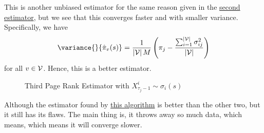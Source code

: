 This is another unbiased estimator for the same reason given in the \hyperref[subsec:second-page-rank-estimator]{second estimator},
but we see that this converges faster and with smaller variance. Specifically, we have
\[
	\variance{}{\hat{\pi}_v(s)} = \frac{1}{\left\vert \mathcal{\MakeUppercase{v}}  \right\vert M}\left(\pi_{j} - \frac{\sum_{i=1}^{\left\vert \mathcal{\MakeUppercase{v}}  \right\vert} \sigma_{ij}^2}{\left\vert \mathcal{\MakeUppercase{v}}  \right\vert}\right)
\]
for all \(v\in \mathcal{\MakeUppercase{v}} \). Hence, this is a better estimator.

\begin{figure}[H]
	\centering
	\caption{Third Page Rank Estimator with \(X^i_{\tau_j - 1}\sim\sigma_i(s)\)}
	\label{fig:Monte-Carlo-Estimator-3}
\end{figure}

\begin{problem}
Although the estimator found by \hyperref[algo:Monte-Carlo-algorithm-3]{this algorithm} is better than the other two,
but it still has its flaws.  The main thing is, it throws away so much data, which means, which means it will converge slower.
\end{problem}